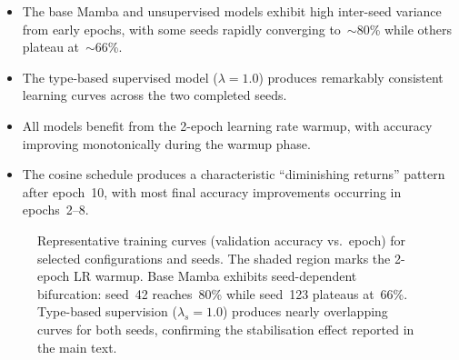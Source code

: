 \documentclass[conference]{IEEEtran}
\begin{document}
\begin{itemize}[nosep]
    \item The base Mamba and unsupervised models exhibit high
          inter-seed variance from early epochs, with some seeds
          rapidly converging to~$\sim$80\% while others plateau
          at~$\sim$66\%.
    \item The type-based supervised model ($\lambda{=}1.0$)
          produces remarkably consistent learning curves across
          the two completed seeds.
    \item All models benefit from the 2-epoch learning rate
          warmup, with accuracy improving monotonically during
          the warmup phase.
    \item The cosine schedule produces a characteristic
          ``diminishing returns'' pattern after epoch~10,
          with most final accuracy improvements occurring in
          epochs~2--8.
\end{itemize}

\begin{figure}[H]
\centering
{}
\caption{Representative training curves (validation accuracy
vs.\ epoch) for selected configurations and seeds.  The shaded
region marks the 2-epoch LR warmup.  Base Mamba exhibits
seed-dependent bifurcation: seed~42 reaches~80\% while seed~123
plateaus at~66\%.  Type-based supervision ($\lambda_s{=}1.0$)
produces nearly overlapping curves for both seeds, confirming
the stabilisation effect reported in the main text.}
\label{fig:app_training}
\end{figure}
\end{document}
